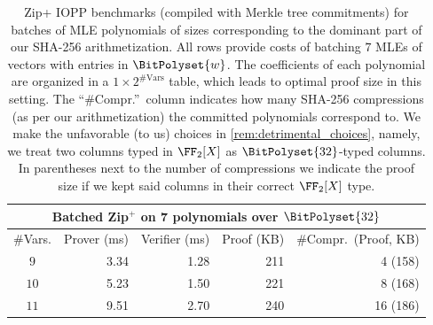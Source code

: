 \begin{table}[H]
\centering
\begin{tabular}{crrrr}
\toprule
\multicolumn{5}{c}{\textbf{Batched Zip${}^+$ on 7 polynomials over $\BitPolyset{32}$}} \\
\midrule
\#Vars. & Prover (ms) & Verifier (ms) & Proof (KB) & \#Compr.\ (Proof, KB) \\
\midrule
$9$  & 3.34 & 1.28 & 211 & 4 (158)  \\
$10$  & 5.23 & 1.50& 221 & 8 (168)\\
$11$ & 9.51 & 2.70 & 240 & 16 (186) \\
\bottomrule
\end{tabular}
\caption{ Zip+ IOPP benchmarks (compiled with Merkle tree commitments) for batches of MLE polynomials of sizes corresponding to the dominant part of our SHA-256 arithmetization. All rows provide costs of batching $7$ MLEs of vectors with entries in $\BitPolyset{w}$.
The coefficients of each polynomial are organized in a $1 \times 2^{\text{\#Vars}}$ table, which leads to optimal proof size in this setting.
\newline
The ``\#Compr.''\ column indicates how many SHA-256 compressions (as per our arithmetization) the committed polynomials correspond to. We make the unfavorable (to us) choices in \cref{rem:detrimental_choices}, namely, we treat two columns typed in $\FF_2[X]$ as $\BitPolyset{32}$-typed columns.  In parentheses next to the number of compressions we indicate the proof size if we kept said columns in their correct $\FF_2[X]$ type.}
\label{tab:sha256_intro_bench}
\end{table}


